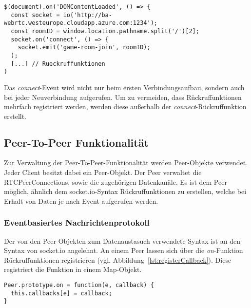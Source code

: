 \vspace{5pt}
\lstset{language=js, style=STYLE_CODE_JS}
\begin{minipage}{\textwidth}
\begin{singlespace}
\begin{lstlisting}[caption={Clientseitiger Verbindungsaufbau -- game.js}, captionpos=b, label={lst:socketioclient}]
$(document).on('DOMContentLoaded', () => {
  const socket = io('http://ba-webrtc.westeurope.cloudapp.azure.com:1234');
  const roomID = window.location.pathname.split('/')[2];
  socket.on('connect', () => {
    socket.emit('game-room-join', roomID);
  );
  [...] // Rueckruffunktionen
)
\end{lstlisting}
\end{singlespace}
\end{minipage}

Das \textit{connect}-Event wird nicht nur beim ersten Verbindungsaufbau, sondern auch bei jeder Neuverbindung aufgerufen. Um zu vermeiden, dass Rückruffunktionen mehrfach registriert werden, werden diese außerhalb der \textit{connect}-Rückruffunktion erstellt. 

\subsection{Peer-To-Peer Funktionalität}
Zur Verwaltung der Peer-To-Peer-Funktionalität werden \glqq{}Peer\grqq{}-Objekte verwendet. Jeder Client besitzt dabei ein Peer-Objekt. Der Peer verwaltet die RTCPeerConnections, sowie die zugehörigen Datenkanäle. Es ist dem Peer möglich, ähnlich dem socket.io-Syntax Rückruffunktionen zu erstellen, welche bei Erhalt von Daten je nach Event aufgerufen werden.\par

\subsubsection{Eventbasiertes Nachrichtenprotokoll}
Der von den Peer-Objekten zum Datenaustasuch verwendete Syntax ist an den Syntax von socket.io angelehnt. An einem Peer lassen sich über die \textit{on}-Funktion Rückruffunktionen registrieren (vgl. Abbildung~\ref{lst:registerCallback}). Diese registriert die Funktion in einem Map-Objekt.\par

\vspace{5pt}
\lstset{language=js, style=STYLE_CODE_JS}
\begin{singlespace}
\begin{lstlisting}[caption={Funktion zur Registrierung von Rückruffunktionen -- Peer.js}, captionpos=b, label={lst:registerCallback}]
Peer.prototype.on = function(e, callback) {
  this.callbacks[e] = callback;
}
\end{lstlisting}
\end{singlespace}


